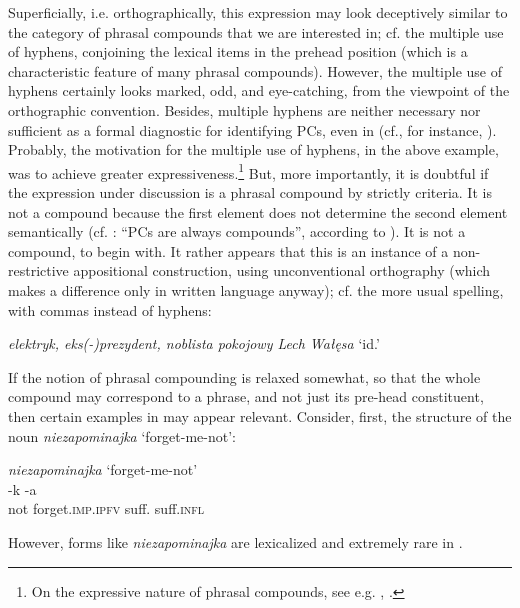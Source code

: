 \documentclass[output=paper]{LSP/langsci}
\begin{document}
{Superficially, i.e. orthographically, this expression may look deceptively similar to the category of phrasal compounds that we are interested in; cf. the multiple use of hyphens, conjoining the lexical items in the prehead position (which is a characteristic feature of many  phrasal compounds). However, the multiple use of hyphens certainly looks marked, odd, and eye-catching,} {from the viewpoint of the  orthographic convention. Besides, multiple hyphens are neither necessary nor sufficient as a formal diagnostic for identifying PCs, even in  (cf., for instance, \citealt[323]{Trips2012}). Probably, the motivation for the multiple use of hyphens, in the above example, was to achieve greater expressiveness.}\footnote{{On the expressive nature of phrasal compounds, see e.g. \citet{Meibauer2013}, \citet{Trips2014}.}} {But, more importantly, it is doubtful if the expression under discussion is a phrasal compound by strictly  criteria. It is not a  compound because the first element does not determine the second element semantically (cf. \citealt[7]{TripsKornfilt2015typology}: “PCs are always  compounds”, according to \citealt{Meibauer2003}). It is not a compound, to begin with. It rather appears that this is an instance of a non-restrictive appositional construction, using} {unconventional orthography (which makes a difference only in written language anyway); cf. the more usual spelling, with commas instead of hyphens:}

\ea\label{ex:szymanek:14b}{\textit{elektryk, eks(-)prezydent, noblista pokojowy Lech Wałęsa}} {‘id.’}
\z 

{If the notion of phrasal compounding is relaxed somewhat, so that the whole compound may correspond to a phrase, and not just its pre-head constituent, then certain examples in  may appear relevant. Consider, first, the structure of the noun} {\textit{niezapominajka}} {‘forget-me-not’:}

\ea\label{ex:szymanek:15} 
\textit{niezapominajka} ‘forget-me-not’\\
 -k  -a\\
{not forget.}\textsc{imp}.\textsc{ipfv} suff. suff.\textsc{infl}\\
 \z

{However, forms like} {\textit{niezapominajka}} {are lexicalized and extremely rare in .}
\end{document}
